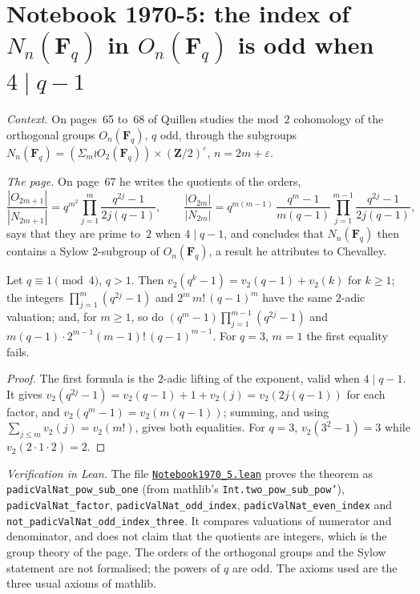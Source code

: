 \section[Notebook 1970-5: the index of $N_n$ in $O_n(\mathbf F_q)$ is odd]{Notebook 1970-5: the index of $N_n(\mathbf F_q)$ in $O_n(\mathbf F_q)$ is odd when $4 \mid q - 1$\protect{}}\label{sec:quillen-1970-5}

\emph{Context.} On pages~65 to~68 of  Quillen studies the mod~$2$ cohomology of the orthogonal groups $O_n(\mathbf F_q)$, $q$ odd, through the subgroups $N_n(\mathbf F_q) = (\Sigma_m \wr O_2(\mathbf F_q)) \times (\mathbf Z/2)^\varepsilon$, $n = 2m + \varepsilon$.

\emph{The page.} On page~67 he writes the quotients of the orders,
\[
\frac{|O_{2m+1}|}{|N_{2m+1}|} = q^{m^2}\prod_{j=1}^m \frac{q^{2j} - 1}{2j(q - 1)}, \qquad \frac{|O_{2m}|}{|N_{2m}|} = q^{m(m-1)}\,\frac{q^m - 1}{m(q-1)}\prod_{j=1}^{m-1}\frac{q^{2j}-1}{2j(q-1)},
\]
says that they are prime to~$2$ when $4 \mid q - 1$, and concludes that $N_n(\mathbf F_q)$ then contains a Sylow $2$-subgroup of $O_n(\mathbf F_q)$, a result he attributes to Chevalley.

\begin{encadre}
\begin{theoreme}\label{thm:quillen-1970-5}
Let $q \equiv 1 \pmod 4$, $q > 1$. Then $v_2(q^k - 1) = v_2(q - 1) + v_2(k)$ for $k \ge 1$; the integers $\prod_{j=1}^m (q^{2j} - 1)$ and $2^m\,m!\,(q-1)^m$ have the same $2$-adic valuation; and, for $m \ge 1$, so do $(q^m - 1)\prod_{j=1}^{m-1}(q^{2j}-1)$ and $m(q-1)\cdot 2^{m-1}(m-1)!\,(q-1)^{m-1}$. For $q = 3$, $m = 1$ the first equality fails.
\end{theoreme}
\end{encadre}

\begin{proof}
The first formula is the $2$-adic lifting of the exponent, valid when $4 \mid q - 1$. It gives $v_2(q^{2j} - 1) = v_2(q-1) + 1 + v_2(j) = v_2(2j(q-1))$ for each factor, and $v_2(q^m - 1) = v_2(m(q-1))$; summing, and using $\sum_{j \le m} v_2(j) = v_2(m!)$, gives both equalities. For $q = 3$, $v_2(3^2 - 1) = 3$ while $v_2(2 \cdot 1 \cdot 2) = 2$.
\end{proof}

\emph{Verification in Lean.} The file \href{\leanblobmain/Notebook1970_5.lean}{\texttt{Notebook1970\_5.\allowbreak{}lean}} proves the theorem as \texttt{padicValNat\_pow\_sub\_one} (from mathlib's \texttt{Int.two\_pow\_sub\_pow'}), \texttt{padicValNat\_factor}, \texttt{padicValNat\_odd\_index}, \texttt{padicValNat\_even\_index} and \texttt{not\_padicValNat\_odd\_index\_three}. It compares valuations of numerator and denominator, and does not claim that the quotients are integers, which is the group theory of the page. The orders of the orthogonal groups and the Sylow statement are not formalised; the powers of $q$ are odd. The axioms used are the three usual axioms of mathlib.

